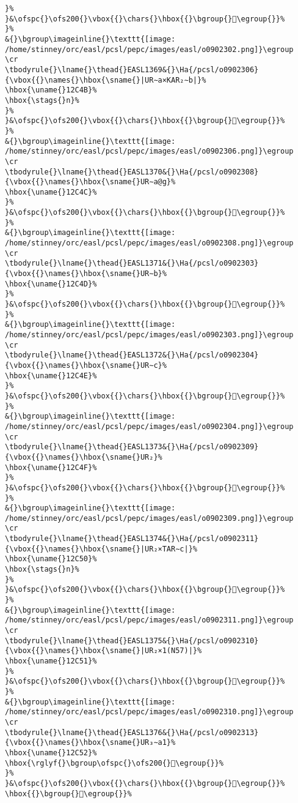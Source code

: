 \begin{verbatim}
}%
}&\ofspc{}\ofs200{}\vbox{{}\chars{}\hbox{{}\bgroup{}𒱊\egroup{}}%
}%
&{}\bgroup\imageinline{}\texttt{[image: /home/stinney/orc/easl/pcsl/pepc/images/easl/o0902302.png]}\egroup
\cr
\tbodyrule{}\lname{}\thead{}EASL1369&{}\Ha{/pcsl/o0902306}{\vbox{{}\names{}\hbox{\sname{}|UR∼a×KAR₂∼b|}%
\hbox{\uname{}12C4B}%
\hbox{\stags{}n}%
}%
}&\ofspc{}\ofs200{}\vbox{{}\chars{}\hbox{{}\bgroup{}𒱋\egroup{}}%
}%
&{}\bgroup\imageinline{}\texttt{[image: /home/stinney/orc/easl/pcsl/pepc/images/easl/o0902306.png]}\egroup
\cr
\tbodyrule{}\lname{}\thead{}EASL1370&{}\Ha{/pcsl/o0902308}{\vbox{{}\names{}\hbox{\sname{}UR∼a@g}%
\hbox{\uname{}12C4C}%
}%
}&\ofspc{}\ofs200{}\vbox{{}\chars{}\hbox{{}\bgroup{}𒱌\egroup{}}%
}%
&{}\bgroup\imageinline{}\texttt{[image: /home/stinney/orc/easl/pcsl/pepc/images/easl/o0902308.png]}\egroup
\cr
\tbodyrule{}\lname{}\thead{}EASL1371&{}\Ha{/pcsl/o0902303}{\vbox{{}\names{}\hbox{\sname{}UR∼b}%
\hbox{\uname{}12C4D}%
}%
}&\ofspc{}\ofs200{}\vbox{{}\chars{}\hbox{{}\bgroup{}𒱍\egroup{}}%
}%
&{}\bgroup\imageinline{}\texttt{[image: /home/stinney/orc/easl/pcsl/pepc/images/easl/o0902303.png]}\egroup
\cr
\tbodyrule{}\lname{}\thead{}EASL1372&{}\Ha{/pcsl/o0902304}{\vbox{{}\names{}\hbox{\sname{}UR∼c}%
\hbox{\uname{}12C4E}%
}%
}&\ofspc{}\ofs200{}\vbox{{}\chars{}\hbox{{}\bgroup{}𒱎\egroup{}}%
}%
&{}\bgroup\imageinline{}\texttt{[image: /home/stinney/orc/easl/pcsl/pepc/images/easl/o0902304.png]}\egroup
\cr
\tbodyrule{}\lname{}\thead{}EASL1373&{}\Ha{/pcsl/o0902309}{\vbox{{}\names{}\hbox{\sname{}UR₂}%
\hbox{\uname{}12C4F}%
}%
}&\ofspc{}\ofs200{}\vbox{{}\chars{}\hbox{{}\bgroup{}𒱏\egroup{}}%
}%
&{}\bgroup\imageinline{}\texttt{[image: /home/stinney/orc/easl/pcsl/pepc/images/easl/o0902309.png]}\egroup
\cr
\tbodyrule{}\lname{}\thead{}EASL1374&{}\Ha{/pcsl/o0902311}{\vbox{{}\names{}\hbox{\sname{}|UR₂×TAR∼c|}%
\hbox{\uname{}12C50}%
\hbox{\stags{}n}%
}%
}&\ofspc{}\ofs200{}\vbox{{}\chars{}\hbox{{}\bgroup{}𒱐\egroup{}}%
}%
&{}\bgroup\imageinline{}\texttt{[image: /home/stinney/orc/easl/pcsl/pepc/images/easl/o0902311.png]}\egroup
\cr
\tbodyrule{}\lname{}\thead{}EASL1375&{}\Ha{/pcsl/o0902310}{\vbox{{}\names{}\hbox{\sname{}|UR₂×1(N57)|}%
\hbox{\uname{}12C51}%
}%
}&\ofspc{}\ofs200{}\vbox{{}\chars{}\hbox{{}\bgroup{}𒱑\egroup{}}%
}%
&{}\bgroup\imageinline{}\texttt{[image: /home/stinney/orc/easl/pcsl/pepc/images/easl/o0902310.png]}\egroup
\cr
\tbodyrule{}\lname{}\thead{}EASL1376&{}\Ha{/pcsl/o0902313}{\vbox{{}\names{}\hbox{\sname{}UR₃∼a1}%
\hbox{\uname{}12C52}%
\hbox{\rglyf{}\bgroup\ofspc{}\ofs200{}𒱒\egroup{}}%
}%
}&\ofspc{}\ofs200{}\vbox{{}\chars{}\hbox{{}\bgroup{}𒱒\egroup{}}%
\hbox{{}\bgroup{}𒱓\egroup{}}%

\end{verbatim}
